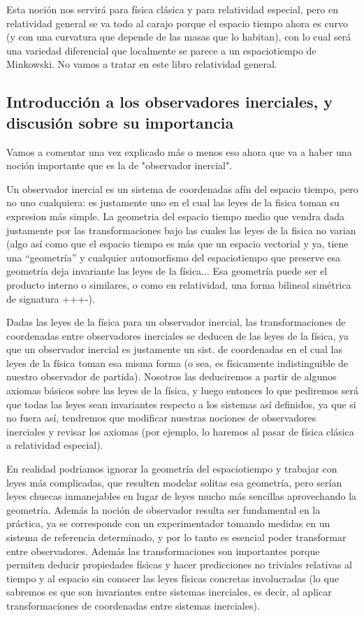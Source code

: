 \documentclass{article}
\begin{document}
Esta noción nos servirá para física clásica y para relatividad especial, pero en relatividad general se va todo al carajo
porque el espacio tiempo ahora es curvo (y con una curvatura que depende de las masas que lo habitan), con lo cual será
una variedad diferencial que localmente se parece a un espaciotiempo de Minkowski. No vamos a tratar en este libro
relatividad general.

\subsection{Introducción a los observadores inerciales, y discusión sobre su importancia}

Vamos a comentar una vez explicado más o menos eso ahora que va a haber una noción importante que es la de "observador inercial".

Un observador inercial es un sistema de coordenadas afín del espacio tiempo, pero no uno cualquiera: es justamente uno
en el cual las leyes de la fisica toman su expresion más simple. La geometria del espacio tiempo medio que
vendra dada justamente por las transformaciones bajo las cuales las leyes de la fisica no varian (algo así
como que el espacio tiempo es más que un espacio vectorial y ya, tiene una ``geometría'' y cualquier automorfismo
del espaciotiempo que preserve esa geometría deja invariante las leyes de la física... Esa geometría puede ser
el producto interno o similares, o como en relatividad, una forma bilineal simétrica de signatura +++-).

Dadas las leyes de la física para un observador inercial, las transformaciones de coordenadas entre observadores inerciales
se deducen de las leyes de la física, ya que un observador inercial es justamente un sist. de coordenadas en el cual
las leyes de la física toman esa misma forma (o sea, es físicamente indistinguible de nuestro observador de partida).
Nosotros las deduciremos a partir de algunos axiomas básicos sobre las leyes de la física, y luego entonces lo que pediremos
será que todas las leyes sean invariantes respecto a los sistemas así definidos, ya que si no fuera así, tendremos que
modificar nuestras nociones de observadores inerciales y revisar los axiomas (por ejemplo, lo haremos al pasar de física
clásica a relatividad especial).

En realidad podríamos ignorar la geometría del espaciotiempo y trabajar con leyes más complicadas, que resulten
modelar solitas esa geometría, pero serían leyes chuecas inmanejables en lugar de leyes mucho más sencillas aprovechando
la geometría. Además
la noción de observador resulta ser fundamental en la práctica, ya se corresponde con un experimentador tomando
medidas en un sistema de referencia determinado, y por lo tanto es esencial poder transformar entre observadores.
Además las transformaciones son importantes porque permiten deducir propiedades físicas y hacer predicciones no triviales
relativas al tiempo y al espacio
sin conocer las leyes físicas concretas involucradas (lo que sabremos es que son invariantes entre sistemas inerciales, es decir,
al aplicar transformaciones de coordenadas entre sistemas inerciales).
\end{document}
